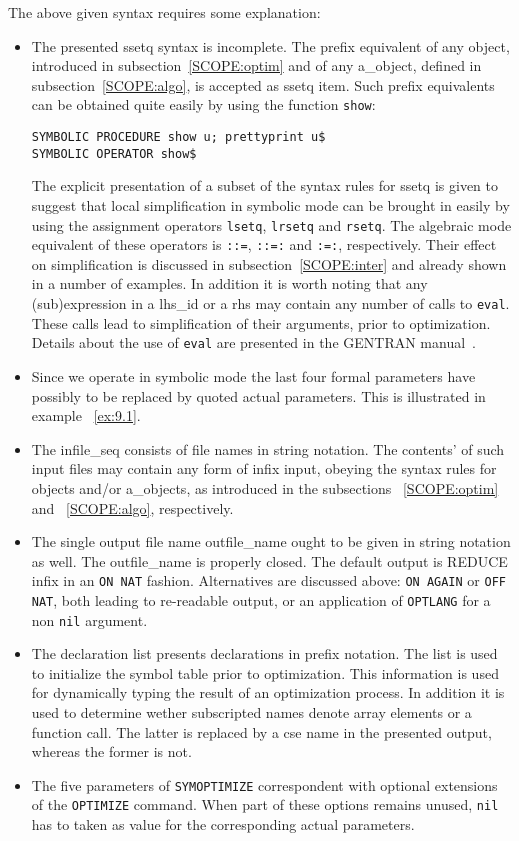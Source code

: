 The above given syntax requires some explanation:
\begin{itemize}
\item The presented ssetq syntax is incomplete. The prefix equivalent of
any object, introduced in subsection~\ref{SCOPE:optim} and of any a\_object,
defined in subsection~\ref{SCOPE:algo}, is accepted as ssetq item. Such prefix
equivalents can be obtained quite easily by using the function {\tt show}:

\hspace*{1cm} {\tt SYMBOLIC PROCEDURE show u; prettyprint u}\verb+$+ \\
\hspace*{1cm} {\tt SYMBOLIC OPERATOR show}\verb+$+

The explicit presentation of a subset of the syntax rules for ssetq
is given to suggest that local simplification in symbolic mode can be brought
in easily by using the assignment operators {\tt lsetq}, {\tt lrsetq}
and {\tt rsetq}. The algebraic mode equivalent of these operators is
{\tt ::=}, {\tt ::=:} and {\tt :=:}, respectively. Their effect on
simplification is discussed in subsection~\ref{SCOPE:inter} and already
shown in a number of examples. In addition it is worth noting that
any (sub)expression
in a lhs\_id or a rhs may contain any number of calls to {\tt eval}.
These calls lead to simplification of their arguments, prior to optimization.
Details about the use of {\tt eval} are presented in the
GENTRAN manual~\cite{Gates:91}.
\item Since we operate in symbolic mode the last four formal parameters
have possibly to be replaced by quoted actual parameters. This is illustrated
in example ~\ref{ex:9.1}.
\item  The infile\_seq consists of  file names in string notation. The contents'
of such input files may contain any form of infix input, obeying the syntax
rules for objects and/or a\_objects, as introduced in the subsections
 ~\ref{SCOPE:optim} and ~\ref{SCOPE:algo}, respectively.
\item The single output file name  outfile\_name ought to be given in string
notation as well. The outfile\_name  is properly closed. The default output
is REDUCE infix in an {\tt ON NAT} fashion. Alternatives are discussed above:
{\tt ON AGAIN} or {\tt OFF NAT}, both leading to re-readable output, or an
application of {\tt OPTLANG} for a non {\tt nil} argument.
\item The declaration list presents declarations in prefix notation. The list
is used to initialize the symbol table prior to optimization. This
information is used for dynamically typing  the result of an optimization
process. In addition it is used to determine wether subscripted names denote
array elements or a function call. The latter is replaced by a cse name in the
presented output, whereas the former is not.
\item  The five parameters of {\tt SYMOPTIMIZE} correspondent with optional
extensions of the {\tt OPTIMIZE} command. When part of these options remains
unused, {\tt nil} has to taken as value for the corresponding actual parameters.
\end{itemize}
